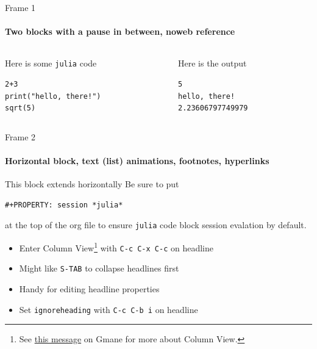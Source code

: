 \documentclass[presentation]{beamer}
\begin{document}
\begin{frame}[fragile,label=sec-1-2]{Frame 1}
 \framesubtitle{Two blocks with a pause in between, noweb reference}
\begin{columns}
\begin{column}{0.5\textwidth}
\begin{block}{Here is some \texttt{julia} code}

\label{simple-code}
\begin{verbatim}
2+3
print("hello, there!")
sqrt(5)
\end{verbatim}

\pause
\end{block}
\end{column}
\begin{column}{0.5\textwidth}
\begin{block}{Here is the output}

\begin{verbatim}
5
hello, there!
2.23606797749979
\end{verbatim}
\end{block}
\end{column}
\end{columns}
\end{frame}
\begin{frame}[fragile,label=sec-1-3]{Frame 2}
 \framesubtitle{Horizontal block, text (list) animations, footnotes, hyperlinks}

\begin{block}{This block extends horizontally}
Be sure to put 

\begin{verbatim}
#+PROPERTY: session *julia*
\end{verbatim}

at the top of the org file to ensure \texttt{julia} code block session evalation by default.
\end{block}
\begin{itemize}[<+->]
\item Enter Column View\footnote{See \href{http://thread.gmane.org/gmane.emacs.orgmode/5107/focus=5134}{this message} on Gmane for more about Column View.} with \texttt{C-c C-x C-c} on headline
\item Might like \texttt{S-TAB} to collapse headlines first
\item Handy for editing headline properties
\item Set \texttt{ignoreheading} with \texttt{C-c C-b i} on headline
\end{itemize}
\end{frame}
\end{document}
